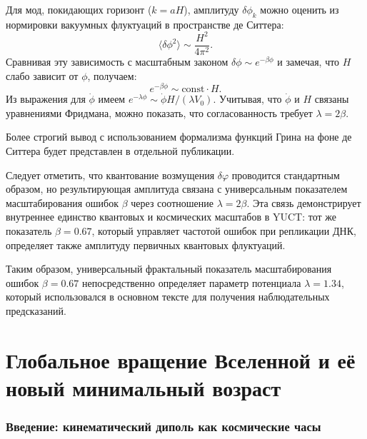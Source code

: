 \documentclass[11pt,a4paper]{article}
\begin{document}
	Для мод, покидающих горизонт (\(k = aH\)), амплитуду \(\delta\phi_k\) можно оценить из нормировки вакуумных флуктуаций в пространстве де Ситтера:
	\begin{equation}
		\langle \delta\phi^2 \rangle \sim \frac{H^2}{4\pi^2}.
	\end{equation}
	Сравнивая эту зависимость с масштабным законом \(\delta\phi \sim e^{-\beta\phi}\) и замечая, что \(H\) слабо зависит от \(\phi\), получаем:
	\begin{equation}
		e^{-\beta\phi} \sim \text{const} \cdot H.
	\end{equation}
	Из выражения для \(\dot{\phi}\) имеем \(e^{-\lambda\phi} \sim \dot{\phi} H / (\lambda V_0)\). Учитывая, что \(\dot{\phi}\) и \(H\) связаны уравнениями Фридмана, можно показать, что согласованность требует \(\lambda = 2\beta\).
	
	Более строгий вывод с использованием формализма функций Грина на фоне де Ситтера будет представлен в отдельной публикации.
	
	Следует отметить, что квантование возмущения \(\delta\varphi\) проводится стандартным образом, но результирующая амплитуда связана с универсальным показателем масштабирования ошибок \(\beta\) через соотношение \(\lambda = 2\beta\). Эта связь демонстрирует внутреннее единство квантовых и космических масштабов в YUCT: тот же показатель \(\beta = 0.67\), который управляет частотой ошибок при репликации ДНК, определяет также амплитуду первичных квантовых флуктуаций.
	
	Таким образом, универсальный фрактальный показатель масштабирования ошибок \(\beta = 0.67\) непосредственно определяет параметр потенциала \(\lambda = 1.34\), который использовался в основном тексте для получения наблюдательных предсказаний.
	
	\clearpage
	\part{Глобальное вращение Вселенной и её новый минимальный возраст}
	\label{part:IV}
	
	\section{Введение: кинематический диполь как космические часы}
	
\end{document}
